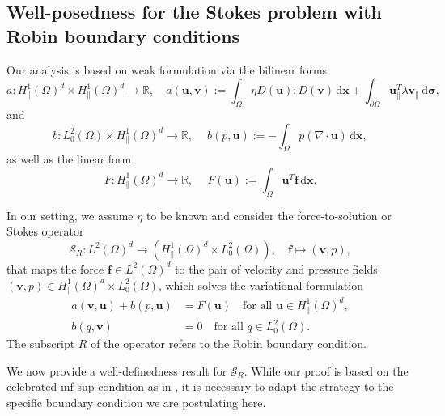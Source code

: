 \documentclass[final,leqno]{scrarticle}
\newcommand{\RR}{\mathbb{R}}
\newcommand{\calS}{\mathcal{S}}
\newcommand{\dd}{\, \mathrm{d}}
\begin{document}
\subsection{Well-posedness for the Stokes problem with Robin boundary conditions}

Our analysis is based on weak formulation %
via the bilinear forms
\begin{displaymath}
    a:  H^1_{\parallel}(\Omega)^d \times H^1_{\parallel}(\Omega)^d  \to \RR, \quad
    a(\mathbf{u},\mathbf{v}) :=  \int_{\Omega} \eta D(\mathbf{u}) : D(\mathbf{v}) \dd \mathbf{x} +\int_{\partial\Omega} \mathbf{u}_{\parallel}^T \lambda \mathbf{v}_{\parallel} \dd \boldsymbol{\sigma}  ,
\end{displaymath}
and
\begin{displaymath}
 b: L^2_0(\Omega) \times H^1_{\parallel}(\Omega)^d  \to \RR, \quad \ b(p,\mathbf{u}) := - \int_{\Omega} p (\nabla \cdot\mathbf{u}) \dd \mathbf{x},
\end{displaymath}
as well as the linear form
\begin{displaymath}
 F: H^1_{\parallel}(\Omega)^d \to \RR, \quad \ F(\mathbf{u}) :=  \int_{\Omega} \mathbf{u}^T \mathbf{f} \dd \mathbf{x}.
\end{displaymath}

In our setting, we assume $\eta$ to be known and consider the force-to-solution or Stokes operator 
\begin{equation} \label{eq:S_R}
 \calS_R : L^2(\Omega)^d \to \left( H^1_{\parallel}(\Omega)^d \times L_0^2(\Omega) \right) ,\quad \mathbf{f} \mapsto (\mathbf{v},p),
\end{equation}
that maps the force $\mathbf{f} \in L^2(\Omega)^d$ to the pair of velocity and pressure fields $(\mathbf{v},p) \in H^1_{\parallel}(\Omega)^d \times L_0^2(\Omega)$, which solves the variational formulation 
\begin{equation} \label{eq:stokes_problem_variational}
 \begin{split}
  a(\mathbf{v},\mathbf{u}) + b(p,\mathbf{u}) &= F(\mathbf{u}) \quad \text{for all } \mathbf{u} \in H^1_{\parallel}(\Omega)^d, \\
  b(q,\mathbf{v}) &= 0 \quad \text{for all } q \in L_0^2(\Omega).
 \end{split}
\end{equation}
The subscript $R$ of the operator refers to the Robin boundary condition.

We now provide a well-definedness result for ${\calS}_R$. While our proof is based on the celebrated inf-sup condition as in \cite{Bof13, Hackbusch17, Lechleiter13}, it is necessary to adapt the strategy to the specific boundary condition we are postulating here.
\end{document}
